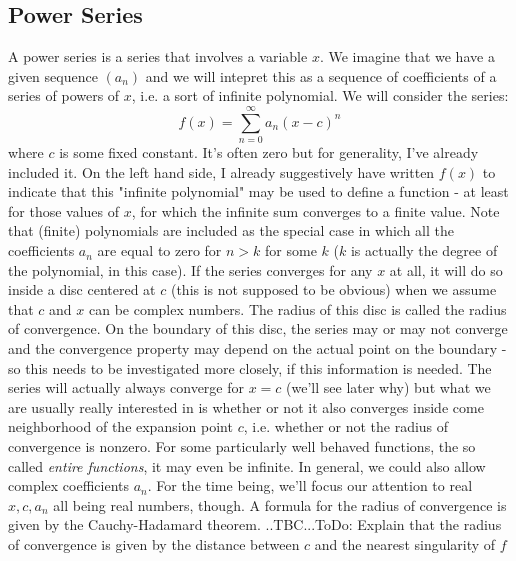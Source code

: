 \subsection{Power Series}
A power series is a series that involves a variable $x$. We imagine that we have a given sequence $(a_n)$ and we will intepret this as a sequence of coefficients of a series of powers of $x$, i.e. a sort of infinite polynomial. We will consider the series:
\begin{equation}
\label{Eq:PowerSeries}
 f(x) = \sum_{n=0}^\infty a_n (x-c)^n
\end{equation}
where $c$ is some fixed constant. It's often zero but for generality, I've already included it. On the left hand side, I already suggestively have written $f(x)$ to indicate that this "infinite polynomial" may be used to define a function - at least for those values of $x$, for which the infinite sum converges to a finite value. Note that (finite) polynomials are included as the special case in which all the coefficients $a_n$ are equal to zero for $n > k$ for some $k$ ($k$ is actually the degree of the polynomial, in this case). If the series converges for any $x$ at all, it will do so inside a disc centered at $c$ (this is not supposed to be obvious) when we assume that $c$ and $x$ can be complex numbers. The radius of this disc is called the radius of convergence. On the boundary of this disc, the series may or may not converge and the convergence property may depend on the actual point on the boundary - so this needs to be investigated more closely, if this information is needed. The series will actually always converge for $x = c$ (we'll see later why) but what we are usually really interested in is whether or not it also converges inside come neighborhood of the expansion point $c$, i.e. whether or not the radius of convergence is nonzero. For some particularly well behaved functions, the so called \emph{entire functions}, it may even be infinite. In general, we could also allow complex coefficients $a_n$. For the time being, we'll focus our attention to real $x,c,a_n$ all being real numbers, though. A formula for the radius of convergence is given by the Cauchy-Hadamard theorem. ..TBC...ToDo: Explain that the radius of convergence is given by the distance between $c$ and the nearest singularity of $f$




